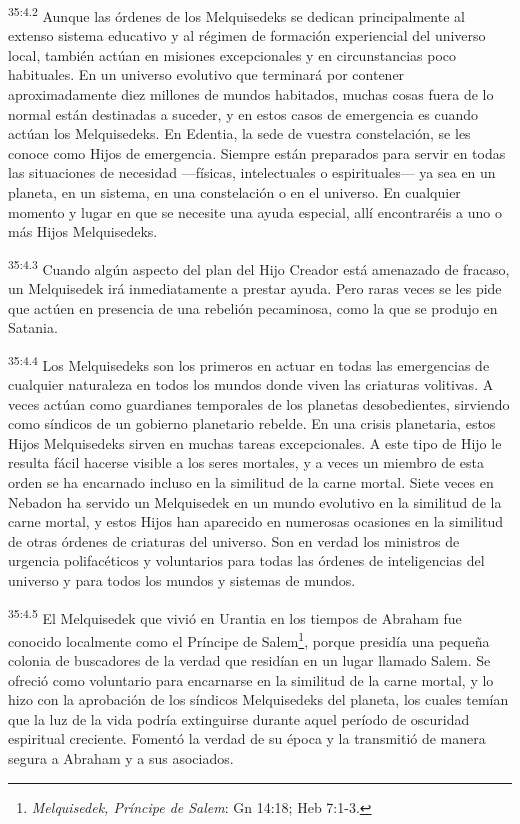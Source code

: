 \par
\textsuperscript{35:4.2} Aunque las órdenes de los Melquisedeks se dedican principalmente al extenso sistema educativo y al régimen de formación experiencial del universo local, también actúan en misiones excepcionales y en circunstancias poco habituales. En un universo evolutivo que terminará por contener aproximadamente diez millones de mundos habitados, muchas cosas fuera de lo normal están destinadas a suceder, y en estos casos de emergencia es cuando actúan los Melquisedeks. En Edentia, la sede de vuestra constelación, se les conoce como Hijos de emergencia. Siempre están preparados para servir en todas las situaciones de necesidad ---físicas, intelectuales o espirituales--- ya sea en un planeta, en un sistema, en una constelación o en el universo. En cualquier momento y lugar en que se necesite una ayuda especial, allí encontraréis a uno o más Hijos Melquisedeks.

\par
\textsuperscript{35:4.3} Cuando algún aspecto del plan del Hijo Creador está amenazado de fracaso, un Melquisedek irá inmediatamente a prestar ayuda. Pero raras veces se les pide que actúen en presencia de una rebelión pecaminosa, como la que se produjo en Satania.

\par
\textsuperscript{35:4.4} Los Melquisedeks son los primeros en actuar en todas las emergencias de cualquier naturaleza en todos los mundos donde viven las criaturas volitivas. A veces actúan como guardianes temporales de los planetas desobedientes, sirviendo como síndicos de un gobierno planetario rebelde. En una crisis planetaria, estos Hijos Melquisedeks sirven en muchas tareas excepcionales. A este tipo de Hijo le resulta fácil hacerse visible a los seres mortales, y a veces un miembro de esta orden se ha encarnado incluso en la similitud de la carne mortal. Siete veces en Nebadon ha servido un Melquisedek en un mundo evolutivo en la similitud de la carne mortal, y estos Hijos han aparecido en numerosas ocasiones en la similitud de otras órdenes de criaturas del universo. Son en verdad los ministros de urgencia polifacéticos y voluntarios para todas las órdenes de inteligencias del universo y para todos los mundos y sistemas de mundos.

\par
\textsuperscript{35:4.5} El Melquisedek que vivió en Urantia en los tiempos de Abraham fue conocido localmente como el Príncipe de Salem\footnote{\textit{Melquisedek, Príncipe de Salem}: Gn 14:18; Heb 7:1-3.}, porque presidía una pequeña colonia de buscadores de la verdad que residían en un lugar llamado Salem. Se ofreció como voluntario para encarnarse en la similitud de la carne mortal, y lo hizo con la aprobación de los síndicos Melquisedeks del planeta, los cuales temían que la luz de la vida podría extinguirse durante aquel período de oscuridad espiritual creciente. Fomentó la verdad de su época y la transmitió de manera segura a Abraham y a sus asociados.

